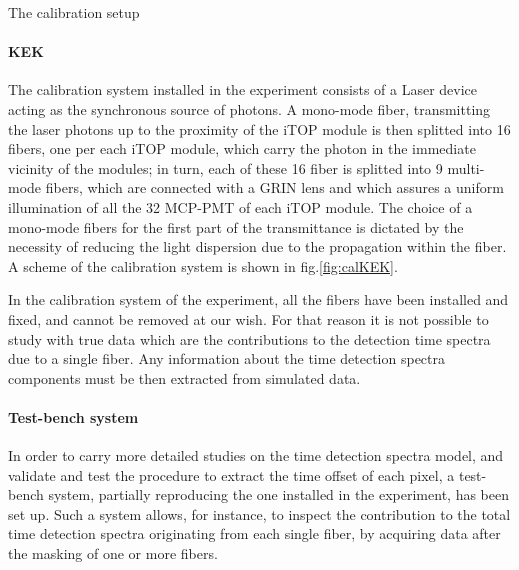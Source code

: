 \documentclass[a4paper,11pt]{article}
\begin{document}
\begin{subsection}{The calibration setup}

\paragraph{KEK} The calibration system installed in the experiment consists of a Laser device acting as the synchronous source of photons. A mono-mode fiber, transmitting the laser photons up to the proximity of the iTOP module is then splitted into 16 fibers, one per each iTOP module, which carry the photon in the immediate vicinity of the modules; in turn, each of these 16 fiber is splitted into 9 multi-mode fibers, which are connected with a GRIN lens and which assures a uniform illumination of all the 32 MCP-PMT of each iTOP module. The choice of a mono-mode fibers for the first part of the transmittance is dictated by the necessity of reducing the light dispersion due to the propagation within the fiber. A scheme of the calibration system is shown in fig.\ref{fig:calKEK}.

In the calibration system of the experiment, all the fibers have been installed and fixed, and cannot be removed at our wish. For that reason it is not possible to study with true data which are the contributions to the detection time spectra due to a single fiber. Any information about the time detection spectra components must be then extracted from simulated data. 







\paragraph{Test-bench system} In order to carry more detailed studies on the time detection spectra model, and validate and test the procedure to extract the time offset of each pixel, a test-bench system, partially reproducing the one installed in the experiment, has been set up. Such a system allows, for instance, to inspect the contribution to the total time detection spectra originating from each single fiber, by acquiring data after the masking of one or more fibers.


\end{subsection}
\end{document}
